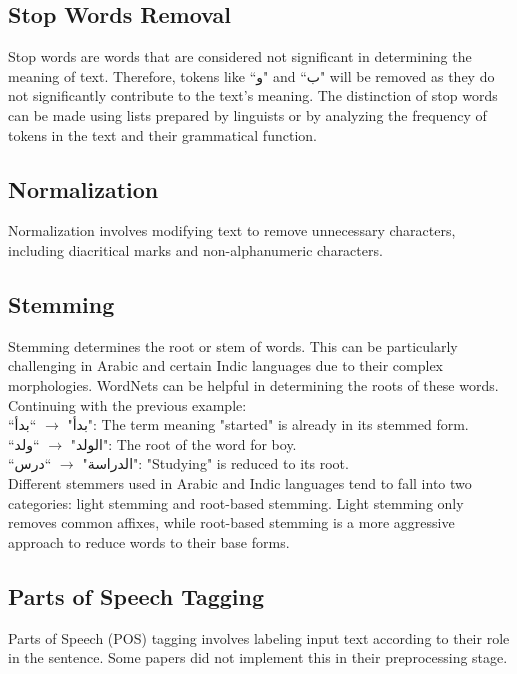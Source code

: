 \documentclass{article}
\begin{document}
	\subsection{Stop Words Removal}
	Stop words are words that are considered not significant in determining the meaning of text. Therefore, tokens like ``\textarabic{و}" and ``\textarabic{ب}" will be removed as they do not significantly contribute to the text's meaning. The distinction of stop words can be made using lists prepared by linguists or by analyzing the frequency of tokens in the text and their grammatical function.
	
	\subsection{Normalization}
	Normalization involves modifying text to remove unnecessary characters, including diacritical marks and non-alphanumeric characters.
	
	\subsection{Stemming}
	Stemming determines the root or stem of words. This can be particularly challenging in Arabic and certain Indic languages due to their complex morphologies. WordNets can be helpful in determining the roots of these words. Continuing with the previous example: \\ 
	``\textarabic{بدأ}" $\rightarrow$ ``\textarabic{بدأ}": The term meaning "started" is already in its stemmed form. \\ 
	``\textarabic{الولد}" $\rightarrow$ ``\textarabic{ولد}": The root of the word for boy. \\ 
	``\textarabic{الدراسة}" $\rightarrow$ ``\textarabic{درس}": "Studying" is reduced to its root. \\ 
	Different stemmers used in Arabic and Indic languages tend to fall into two categories: light stemming and root-based stemming. Light stemming only removes common affixes, while root-based stemming is a more aggressive approach to reduce words to their base forms.
	
	\subsection{Parts of Speech Tagging}
	Parts of Speech (POS) tagging involves labeling input text according to their role in the sentence. Some papers did not implement this in their preprocessing stage.
		
\end{document}
